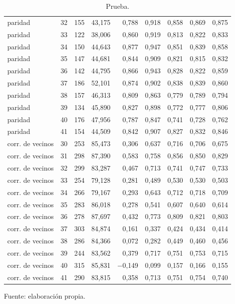 \begin{table}[htbp]
{\begin{tabular}{@{}lrrrrrrrr@{}}
        paridad & 32 & 155 & 43,175 & 0,788 & 0,918 & 0,858 & 0,869 & 0,875 \\
        paridad & 33 & 122 & 38,006 & 0,860 & 0,919 & 0,813 & 0,822 & 0,833 \\
        paridad & 34 & 150 & 44,643 & 0,877 & 0,947 & 0,851 & 0,839 & 0,858 \\
        paridad & 35 & 147 & 44,681 & 0,844 & 0,909 & 0,821 & 0,815 & 0,832 \\
        paridad & 36 & 142 & 44,795 & 0,866 & 0,943 & 0,828 & 0,822 & 0,859 \\
        paridad & 37 & 186 & 52,101 & 0,874 & 0,902 & 0,838 & 0,839 & 0,860 \\
        paridad & 38 & 157 & 46,313 & 0,809 & 0,863 & 0,779 & 0,789 & 0,794 \\
        paridad & 39 & 134 & 45,890 & 0,827 & 0,898 & 0,772 & 0,777 & 0,806 \\
        paridad & 40 & 176 & 47,956 & 0,787 & 0,847 & 0,741 & 0,728 & 0,762 \\
        paridad & 41 & 154 & 44,509 & 0,842 & 0,907 & 0,827 & 0,832 & 0,846 \\
        corr. de vecinos & 30 & 253 & 85,473 & 0,306 & 0,637 & 0,716 & 0,706 & 0,675 \\
        corr. de vecinos & 31 & 298 & 87,390 & 0,583 & 0,758 & 0,856 & 0,850 & 0,829 \\
        corr. de vecinos & 32 & 299 & 83,287 & 0,467 & 0,713 & 0,741 & 0,747 & 0,733 \\
        corr. de vecinos & 33 & 254 & 79,128 & 0,281 & 0,489 & 0,530 & 0,530 & 0,503 \\
        corr. de vecinos & 34 & 266 & 79,167 & 0,293 & 0,643 & 0,712 & 0,718 & 0,709 \\
        corr. de vecinos & 35 & 283 & 86,018 & 0,278 & 0,541 & 0,607 & 0,640 & 0,614 \\
        corr. de vecinos & 36 & 278 & 87,697 & 0,432 & 0,773 & 0,809 & 0,821 & 0,803 \\
        corr. de vecinos & 37 & 303 & 84,874 & 0,161 & 0,337 & 0,424 & 0,434 & 0,414 \\
        corr. de vecinos & 38 & 286 & 84,366 & 0,072 & 0,282 & 0,449 & 0,460 & 0,456 \\
        corr. de vecinos & 39 & 244 & 83,562 & 0,379 & 0,717 & 0,751 & 0,753 & 0,715 \\
        corr. de vecinos & 40 & 315 & 85,831 & $-$0,149 & 0,099 & 0,157 & 0,166 & 0,155 \\
        corr. de vecinos & 41 & 290 & 83,815 & 0,358 & 0,713 & 0,751 & 0,754 & 0,740 \\
        \bottomrule
    \end{tabular}}

    \caption{Prueba.}
    \label{tab:e_tiempo_r2_f}

    {\footnotesize Fuente: elaboración propia.}
\end{table}
